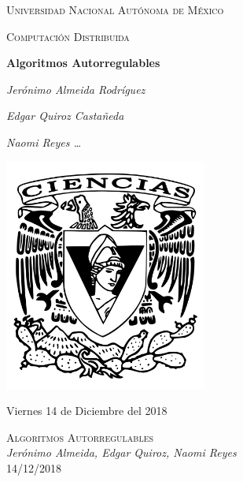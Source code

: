 \documentclass[12pt,a4paper]{article}
\begin{document}
\begin{titlepage}
	\centering
	{\scshape\LARGE Universidad Nacional Autónoma de México \par}
	\vspace{1cm}
	{\scshape\Large Computación Distribuida\par}
	\vspace{1cm}
	{\huge\bfseries Algoritmos Autorregulables\par}
	\vspace{1cm}
    {\Large\itshape Jerónimo Almeida Rodríguez \par}
    \vspace{.5cm}
	{\Large\itshape Edgar Quiroz Castañeda \par}
    \vspace{.5cm}
	{\Large\itshape Naomi Reyes \dots \par}
	\vfill
	\includegraphics[width=0.5\textwidth]{escudo_f-ciencias.png}
	\vfill

	{\large Viernes 14 de Diciembre del 2018 \par}
\end{titlepage}

	\pagebreak
	\setlength{\voffset}{-0.75in}
	\setlength{\headsep}{5pt}


\begin{center}
		\textsc{\huge Algoritmos Autorregulables\\}
		\textit{Jerónimo Almeida, Edgar Quiroz, Naomi Reyes\\}
        14/12/2018
\end{center}
\end{document}
